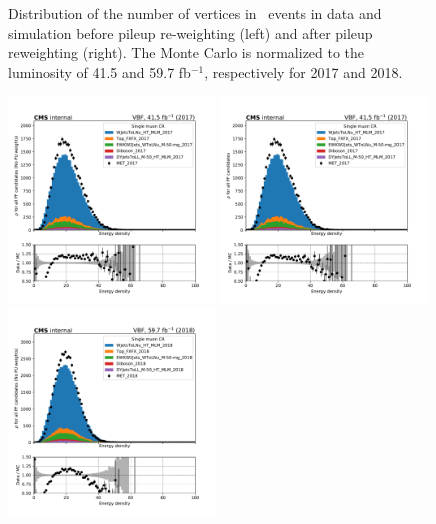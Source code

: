 \begin{figure}[ht!]
\begin{center}
    \caption{
        Distribution of the number of vertices in \Wmn~events in data and
        simulation before pileup re-weighting (left) and after pileup reweighting (right).
        The Monte Carlo is normalized to the luminosity of 41.5 and 59.7 fb$^{-1}$, respectively for 2017 and 2018.
    }
    \label{fig:purwt_npv}
  \end{center}
\end{figure}

\begin{figure}[ht!]
  \begin{center}
    \includegraphics[width=0.49\textwidth]{Pileup/cr_1m_vbf_rho_all_nopu_2017.pdf}
    \includegraphics[width=0.49\textwidth]{Pileup/cr_1m_vbf_rho_all_2017.pdf}
    \includegraphics[width=0.49\textwidth]{Pileup/cr_1m_vbf_rho_all_nopu_2018.pdf}

\end{center}
\end{figure}
